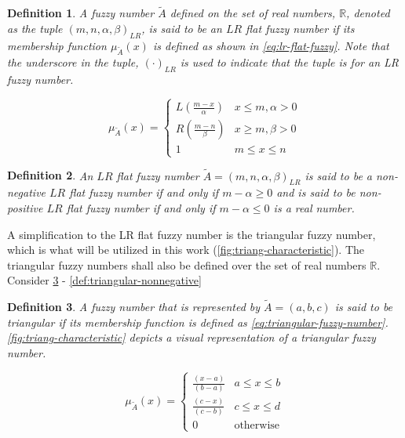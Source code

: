 \documentclass[ee,msthesis]{usuthesis}
\newtheorem{definition}{Definition}[section]
\begin{document}
\begin{definition}
\label{def:lr-flat} A fuzzy number \(\tilde{A}\) defined on the set of real numbers, \(\mathbb{R}\), denoted as the tuple
\((m,n,\alpha,\beta)_{LR}\), is said to be an \(LR\) flat fuzzy number if its membership function \(\mu_{\tilde{A}}(x)\) is defined as
shown in \ref{eq:lr-flat-fuzzy}. Note that the underscore in the tuple, \((\cdot)_{LR}\) is used to indicate that the tuple is for
an LR fuzzy number.

\begin{equation}
\label{eq:lr-flat-fuzzy}
\mu_{\tilde{A}}(x) =
\begin{cases}
L(\frac{m-x}{\alpha}) & x \le m, \alpha > 0 \\
R(\frac{m-n}{\beta}) & x \ge m, \beta > 0 \\
1                & m \le x \le n
\end{cases}
\end{equation}
\end{definition}

\begin{definition}
\label{def:lr-non-negative}
An \(LR\) flat fuzzy number \(\tilde{A} = (m,n,\alpha,\beta)_{LR}\) is said to be a non-negative \(LR\) flat fuzzy number if and only
if \(m-\alpha \ge 0\) and is said to be non-positive \(LR\) flat fuzzy number if and only if \(m - \alpha \le 0\) is a real number.
\end{definition}

A simplification to the LR flat fuzzy number is the triangular fuzzy number, which is what will be utilized in this work
(\ref{fig:triang-characteristic}). The triangular fuzzy numbers shall also be defined over the set of real numbers \(\mathbb{R}\). Consider
\ref{def:triangular-fuzzy-number} - \ref{def:triangular-nonnegative}

\begin{definition}
\label{def:triangular-fuzzy-number} A fuzzy number that is represented by \(\tilde{A} = (a,b,c)\) is said to be triangular
if its membership function is defined as \ref{eq:triangular-fuzzy-number}. \ref{fig:triang-characteristic} depicts a visual
representation of a triangular fuzzy number.

\begin{equation}
\label{eq:triangular-fuzzy-number}
  \mu_{\tilde{A}}(x) =
  \begin{cases}
    \frac{(x-a)}{(b-a)} & a \le x \le b \\
    \frac{(c-x)}{(c-b)} & c \le x \le d \\
    0                   & \text{otherwise}
  \end{cases}
\end{equation}
\end{definition}
\end{document}
